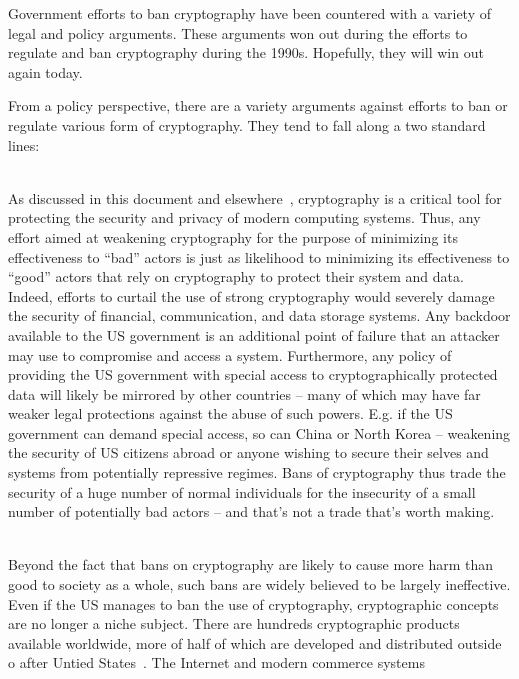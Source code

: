 Government efforts to ban cryptography have been countered with a
variety of legal and policy arguments. These arguments won out during
the efforts to regulate and ban cryptography during the
1990s. Hopefully, they will win out again today.

From a policy perspective, there are a variety arguments against
efforts to ban or regulate various form of cryptography. They tend to
fall along a two standard lines:

\begin{packed_desc}
\item[More Harm Than Good] \hfill \\ As discussed in this document and
  elsewhere~\cite{abelson2015}, cryptography is a critical tool for
  protecting the security and privacy of modern computing
  systems. Thus, any effort aimed at weakening cryptography for the
  purpose of minimizing its effectiveness to ``bad'' actors is just as
  likelihood to minimizing its effectiveness to ``good'' actors that
  rely on cryptography to protect their system and data. Indeed,
  efforts to curtail the use of strong cryptography would severely
  damage the security of financial, communication, and data storage
  systems. Any backdoor available to the US government is an
  additional point of failure that an attacker may use to compromise
  and access a system. Furthermore, any policy of providing the US
  government with special access to cryptographically protected data
  will likely be mirrored by other countries -- many of which may have
  far weaker legal protections against the abuse of such
  powers. E.g. if the US government can demand special access, so can
  China or North Korea -- weakening the security of US citizens abroad
  or anyone wishing to secure their selves and systems from
  potentially repressive regimes. Bans of cryptography thus trade the
  security of a huge number of normal individuals for the insecurity
  of a small number of potentially bad actors -- and that's not a
  trade that's worth making.
\item[Ineffectiveness] \hfill \\ Beyond the fact that bans on
  cryptography are likely to cause more harm than good to society as a
  whole, such bans are widely believed to be largely ineffective. Even
  if the US manages to ban the use of cryptography, cryptographic
  concepts are no longer a niche subject. There are hundreds
  cryptographic products available worldwide, more of half of which
  are developed and distributed outside o after Untied
  States~\cite{schneier2016}. The Internet and modern commerce systems

\end{packed_desc}
